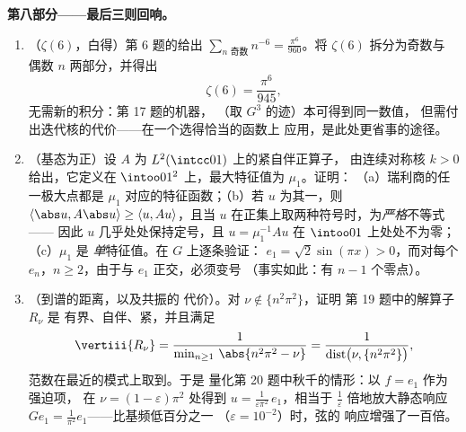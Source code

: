 \begin{problem}
\medskip
\noindent\textbf{第八部分——最后三则回响。}
\begin{enumerate}[resume]
  \item （$\zeta(6)$，白得）第 6 题的给出 $\sum_{n\text{ 奇数}}n^{-6} =
        \frac{\pi^6}{960}$。将 $\zeta(6)$ 拆分为奇数与
        偶数 $n$ 两部分，并得出
        \[
        \zeta(6) = \frac{\pi^6}{945},
        \]
        无需新的积分：第 17 题的机器，
        （取 $G^3$ 的迹）本可得到同一数值，
        但需付出迭代核的代价——在一个选得恰当的函数上
        应用，是此处更省事的途径。
  \item （基态为正）设 $A$ 为
        $L^2(\intcc01)$ 上的紧自伴正算子，
        由连续对称核 $k > 0$ 给出，它定义在
        $\intoo01^2$ 上，最大特征值为 $\mu_1$。证明：
        （a）瑞利商的任一极大点都是
        $\mu_1$ 对应的特征函数；（b）若 $u$ 为其一，则
        $\langle\abs u, A\abs u\rangle \geq \langle u,
        Au\rangle$，且当 $u$ 在正集上取两种符号时，为\emph{严格}不等式——
        因此 $u$
        几乎处处保持定号，且 $u = \mu_1^{-1}Au$
        在 $\intoo01$ 上处处不为零；（c）$\mu_1$ 是
        \emph{单}特征值。在 $G$ 上逐条验证：
        $e_1 = \sqrt2\sin(\pi x) > 0$，而对每个 $e_n$，$n
        \geq 2$，由于与 $e_1$ 正交，必须变号
        （事实如此：有 $n - 1$ 个零点）。
  \item （到谱的距离，以及共振的
        代价）。对 $\nu \notin \{n^2\pi^2\}$，证明
        第 19 题中的解算子 $R_\nu$ 是
        有界、自伴、紧，并且满足
        \[
        \vertiii{R_\nu} =
        \frac1{\min_{n\geq1}\,\abs{n^2\pi^2 - \nu}}
        = \frac1{\operatorname{dist}\bigl(\nu,
        \{n^2\pi^2\}\bigr)},
        \]
        范数在最近的模式上取到。于是
        量化第 20 题中秋千的情形：以 $f = e_1$ 作为强迫项，
        在 $\nu = (1 - \varepsilon)\pi^2$ 处得到 $u =
        \frac{1}{\varepsilon\pi^2}\,e_1$，相当于
        $\frac1\varepsilon$ 倍地放大静态响应 $Ge_1 =
        \frac1{\pi^2}e_1$——比基频低百分之一
        （$\varepsilon = 10^{-2}$）时，弦的
        响应增强了一百倍。
\end{enumerate}
\end{problem}
